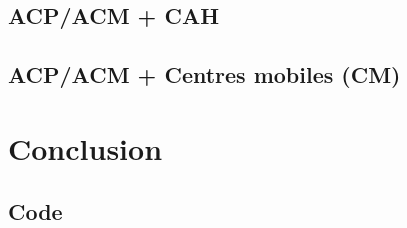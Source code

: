 \documentclass{rapportECL}
\begin{document}
\subsection{ACP/ACM + CAH}


\subsection{ACP/ACM + Centres mobiles (CM)}


\section{Conclusion}


\newpage
\subsection{Code}









\newpage

\end{document}
